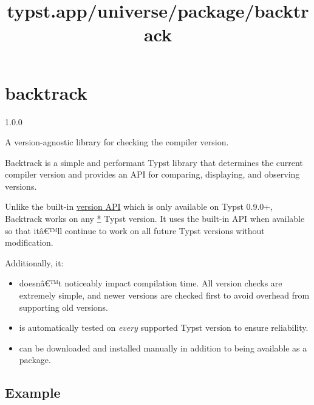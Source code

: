 \title{typst.app/universe/package/backtrack}

\label{banner}
\section{backtrack}\label{backtrack}

{ 1.0.0 }

A version-agnostic library for checking the compiler version.

\label{readme}
Backtrack is a simple and performant Typst library that determines the
current compiler version and provides an API for comparing, displaying,
and observing versions.

Unlike the built-in
\href{https://github.com/typst/typst/pull/2016}{version API} which is
only available on Typst 0.9.0+, Backtrack works on any
\href{https://github.com/typst/packages/raw/main/packages/preview/backtrack/1.0.0/\#version-support}{*}
Typst version. It uses the built-in API when available so that itâ€™ll
continue to work on all future Typst versions without modification.

Additionally, it:

\begin{itemize}
\tightlist
\item
  doesnâ€™t noticeably impact compilation time. All version checks are
  extremely simple, and newer versions are checked first to avoid
  overhead from supporting old versions.
\item
  is automatically tested on \emph{every} supported Typst version to
  ensure reliability.
\item
  can be downloaded and installed manually in addition to being
  available as a package.
\end{itemize}

\subsection{Example}\label{example}

\begin{Shaded}
\begin{Highlighting}[]

\NormalTok{\#\{}
\NormalTok{  if current{-}version.cmpable \textless{}= versions.v2023{-}03{-}28.cmpable [}
\NormalTok{  ] else if current{-}version.cmpable \textless{} versions.v0{-}5{-}0.cmpable [}
\NormalTok{  ] else [}
\NormalTok{  ]}
\NormalTok{\}}
\end{Highlighting}
\end{Shaded}

